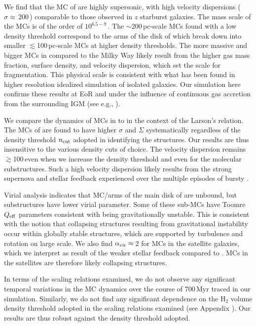 \IfFileExists{emulateapjlegacy.cls}{\documentclass[iop]{emulateapjlegacy}}{\documentclass[iop]{emulateapj}}
\begin{document}
We find that the MC of \flower are highly supersonic, with high velocity dispersions ($\sigma\approx$\,200\,\kms) comparable to
those observed in $z$ starburst galaxies.
The mass scale of the MCs is of the order of $10^{6.5-9}$\,\Msun. The $\sim$200\,pc-scale MCs found with a low density threshold
correspond to the arms of the disk of \flower which break down into smaller $\lesssim$100\,pc-scale MCs at higher density thresholds.
The more massive and bigger MCs in \flower compared to the Milky Way
likely result from the higher gas mass fraction, surface density, and velocity dispersion,
which set the scale for fragmentation.
This physical scale is 
consistent with what has been found in higher resolution idealized simulation of isolated galaxies.
Our simulation here confirms these results at EoR and under
the influence of continuous gas accretion from the surrounding IGM (see e.g., \citealt{Klessen10a, Goldbaum11a}).

We compare the dynamics of MCs in \flower to \obs in the context of the Larson's relation.
The MCs of \flower are found to have higher $\sigma$ and $\Sigma$ systematically regardless of the 
density threshold $n_{\rm cut}$ adopted in identifying the structures.
Our results are thus insensitive to the various density cuts of choice.
The velocity dispersion remains $\gtrsim$100\,\kms even when we increase the 
density threshold and even for the molecular substructures.
Such a high velocity dispersion likely results from
the strong supernova and stellar feedback \flower experienced over the multiple episodes of bursty \SF.

Virial analysis indicates that MC/arms of the main disk of \flower are unbound, but substructures have
lower virial parameter. Some of these sub-MCs have Toomre $Q_{\rm eff}$ parameters consistent with being 
gravitationally unstable. This is consistent with the notion that collapsing structures resulting from
gravitational instability occur within globally stable structures, which are
supported by turbulence and rotation on large scale.
We also find $\alpha_{\rm vir}\approx$\,2 for MCs in the satellite galaxies, which we interpret as
result of the weaker stellar feedback compared to \flower.
MCs in the satellites are therefore likely collapsing structures.

In terms of the scaling relations examined, we do not observe any significant
temporal variations in the MC dynamics over the course of 700\,Myr traced in our simulation.
Similarly, we do not find any significant dependence on the H$_2$ volume density threshold adopted
in the scaling relations examined (see Appendix ). 
Our results are thus robust against the density threshold adopted.
\end{document}
